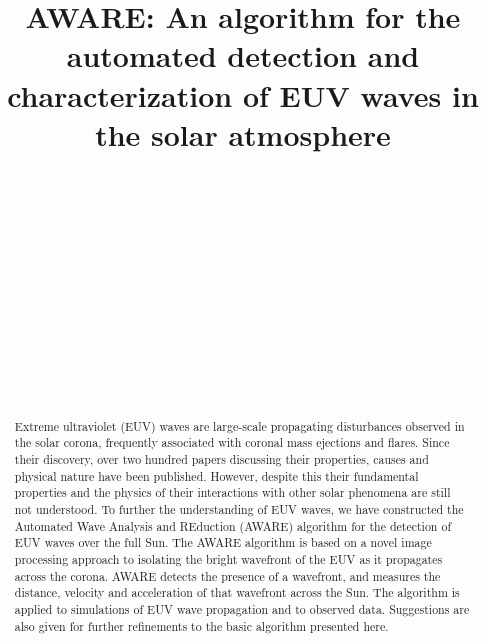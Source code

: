 \documentclass[namedreferences]{solarphysics}
\begin{document}
\begin{article}
\begin{opening}

\title{AWARE: An algorithm for the automated detection and characterization
  of EUV waves in the solar atmosphere}

\author[addressref={aff1,aff2}, corref, email={jack.ireland@nasa.gov}]{~}%
\author[addressref={aff1,aff3}, email={a.r.inglis@nasa.gov}]{~}%
\author[addressref={aff1}, email={a.y.shih@nasa.gov}]{~}%
\author[addressref={aff1}, email={s.christe@nasa.gov}]{~}%
\author[addressref={aff4}, email={stuart@cadair.com}]{~}%
\author[addressref={aff5}, email={hayesla@tcd.ie}]{~}%
\author[addressref={aff1}, email={b.j.thompson@nasa.gov}]{~}%

\address[id=aff1]{ADNET Systems, Inc.}
\address[id=aff2]{NASA Goddard Spaceflight Center, Greenbelt, MD 20771, USA.}
\address[id=aff3]{Catholic University of America.}
\address[id=aff4]{University of Sheffield, Sheffield, UK.}
\address[id=aff5]{Trinity College Dublin, Dublin, Ireland.}


\begin{abstract}Extreme ultraviolet (EUV) waves are large-scale propagating
disturbances observed in the solar corona, frequently associated with
coronal mass ejections and flares. Since their discovery, over two
hundred papers discussing their properties, causes and physical nature have
been published. However, despite this their fundamental properties and the physics of
their interactions with other solar phenomena are still not
understood. To further the understanding of EUV waves, we have constructed the Automated
Wave Analysis and REduction (AWARE) algorithm for the detection of EUV
waves over the full Sun. The AWARE algorithm is based on a novel image
processing approach to isolating the bright wavefront of the EUV as it
propagates across the corona.  AWARE detects the presence of a
wavefront, and measures the distance, velocity and acceleration of
that wavefront across the Sun.  The algorithm is applied to
simulations of EUV wave propagation and to observed data.  Suggestions
are also given for further refinements to the basic algorithm presented
here.
\end{abstract}


\end{opening}
\end{article}
\end{document}
